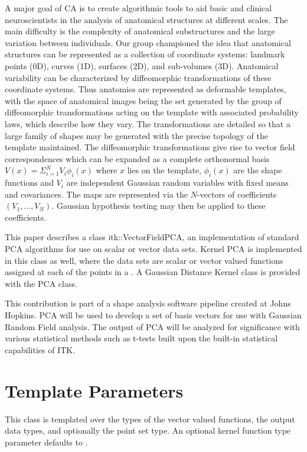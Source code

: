 \documentclass{InsightArticle}
\begin{document}
A major goal of CA is to create algorithmic tools to aid basic and clinical
neuroscientists in the analysis of anatomical structures at different scales.
The main difficulty is the complexity of anatomical substructures and the large
variation between individuals. Our group championed the idea that anatomical
structures can be represented as a collection of coordinate systems: landmark
points (0D), curves (1D), surfaces (2D), and sub-volumes (3D). Anatomical
variability can be characterized by diffeomorphic transformations of these
coordinate systems. Thus anatomies are represented as deformable templates,
with the space of anatomical images being the set generated by the group of
diffeomorphic transformations acting on the template with associated
probability laws, which describe how they vary. The transformations are
detailed so that a large family of shapes may be generated with the precise
topology of the template maintained. The diffeomorphic transformations give
rise to vector field correspondences which can be expanded as a complete
orthonormal basis $V(x) = \Sigma_ {i=1}^{N} V_i \phi_i(x) $ where $ x $ lies
on the template, $ \phi_i(x) $  are the shape functions and $ V_i $ are
independent Gaussian random variables with fixed means and covariances.
The maps are represented via the $ N $-vectors of coefficients
$ (V_1,...,V_N) $. Gaussian hypothesis testing may then be applied to these
coefficients.

This paper describes a class itk::VectorFieldPCA, an implementation of standard
PCA algorithms for use on
scalar or vector data sets.  Kernel PCA is implemented in this class as well,
where the data sets are scalar or vector valued functions assigned at each of
the points in a .  A Gaussian Distance Kernel class is provided
with the PCA class.

This contribution is part of a shape analysis software pipeline created
at Johns Hopkins.  PCA will be used to develop a set of
basis vectors for use with Gaussian Random Field analysis.  The output of PCA
will be analyzed for significance with various statistical methods such as
t-tests built upon the built-in statistical capabilities of ITK.


\section{Template Parameters}

This class is templated over the types of the vector valued functions,
the output data types, and optionally the point set type.  An optional kernel
function type parameter defaults to .
\end{document}
